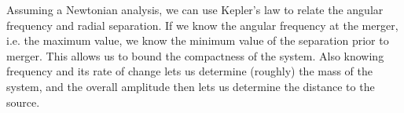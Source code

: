 \documentclass[12pt]{article}
\begin{document}
\begin{enumerate}[label=\alph*)]
\begin{figure}[h]
\end{figure}

Assuming a Newtonian analysis, we can use Kepler's law to relate the angular frequency and radial separation. If we know the angular frequency at the merger, i.e. the maximum value, we know the minimum value of the separation prior to merger. This allows us to bound the compactness of the system.
Also knowing frequency and its rate of change lets us determine (roughly) the mass of the system, and the overall amplitude then lets us determine the distance to the source.


\end{enumerate}
\color{black}
\end{document}
